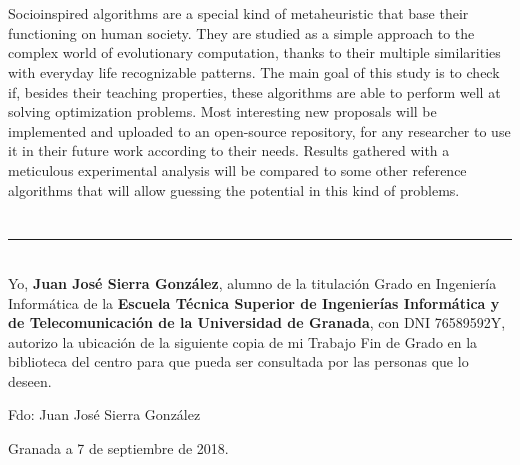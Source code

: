 \\

\vspace{0.7cm}
\\

Socioinspired algorithms are a special kind of metaheuristic that base their functioning on human society. They are studied as a simple approach to the complex world of evolutionary computation, thanks to their multiple similarities with everyday life recognizable patterns. The main goal of this study is to check if, besides their teaching properties, these algorithms are able to perform well at solving optimization problems. Most interesting new proposals will be implemented and uploaded to an open-source repository, for any researcher to use it in their future work according to their needs. Results gathered with a meticulous experimental analysis will be compared to some other reference algorithms that will allow guessing the potential in this kind of problems.

\chapter*{}
\thispagestyle{empty}

\noindent\rule[-1ex]{\textwidth}{2pt}\\[4.5ex]

Yo, \textbf{Juan José Sierra González}, alumno de la titulación Grado en Ingeniería Informática de la \textbf{Escuela Técnica Superior
de Ingenierías Informática y de Telecomunicación de la Universidad de Granada}, con DNI 76589592Y, autorizo la
ubicación de la siguiente copia de mi Trabajo Fin de Grado en la biblioteca del centro para que pueda ser
consultada por las personas que lo deseen.

\vspace{6cm}

\noindent Fdo: Juan José Sierra González

\vspace{2cm}

\begin{flushright}
Granada a 7 de septiembre de 2018.
\end{flushright}


\chapter*{}
\thispagestyle{empty}

